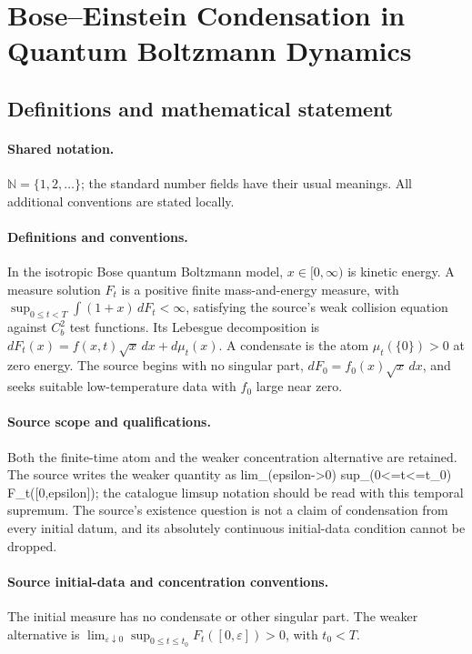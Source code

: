 \documentclass[11pt]{article}
\begin{document}
\section{Bose–Einstein Condensation in Quantum Boltzmann Dynamics}\label{statement}

\subsection{Definitions and mathematical statement}

\paragraph{Shared notation.}$\mathbb N=\{1,2,\ldots\}$; the standard number fields have their usual meanings. All additional conventions are stated locally.


\paragraph{Definitions and conventions.} In the isotropic Bose quantum Boltzmann model, $x\in[0,\infty)$ is kinetic energy. A measure solution $F_t$ is a positive finite mass-and-energy measure, with $\sup_{0\le t<T}\int(1+x)\,dF_t<\infty$, satisfying the source's weak collision equation against $C_b^2$ test functions. Its Lebesgue decomposition is $dF_t(x)=f(x,t)\sqrt{x}\,dx+d\mu_t(x)$. A condensate is the atom $\mu_t(\{0\})>0$ at zero energy. The source begins with no singular part, $dF_0=f_0(x)\sqrt{x}\,dx$, and seeks suitable low-temperature data with $f_0$ large near zero.

\paragraph{Source scope and qualifications.} Both the finite-time atom and the weaker concentration alternative are retained. The source writes the weaker quantity as lim\_(epsilon->0) sup\_(0<=t<=t\_0) F\_t([0,epsilon]); the catalogue limsup notation should be read with this temporal supremum. The source's existence question is not a claim of condensation from every initial datum, and its absolutely continuous initial-data condition cannot be dropped.

\paragraph{Source initial-data and concentration conventions.} The initial measure has no condensate or other singular part. The weaker alternative is $\lim_{\varepsilon\downarrow0}\sup_{0\le t\le t_0}F_t([0,\varepsilon])>0$, with $t_0<T$.
\end{document}
